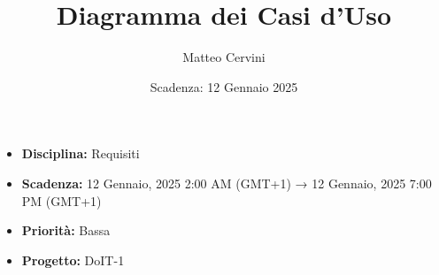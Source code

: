 \title{Diagramma dei Casi d'Uso}
\author{Matteo Cervini}
\date{Scadenza: 12 Gennaio 2025}

\maketitle

\begin{itemize}
    \item \textbf{Disciplina:} Requisiti
    \item \textbf{Scadenza:} 12 Gennaio, 2025 2:00 AM (GMT+1) → 12 Gennaio, 2025 7:00 PM (GMT+1)
    \item \textbf{Priorità:} Bassa
    \item \textbf{Progetto:} DoIT-1
\end{itemize}